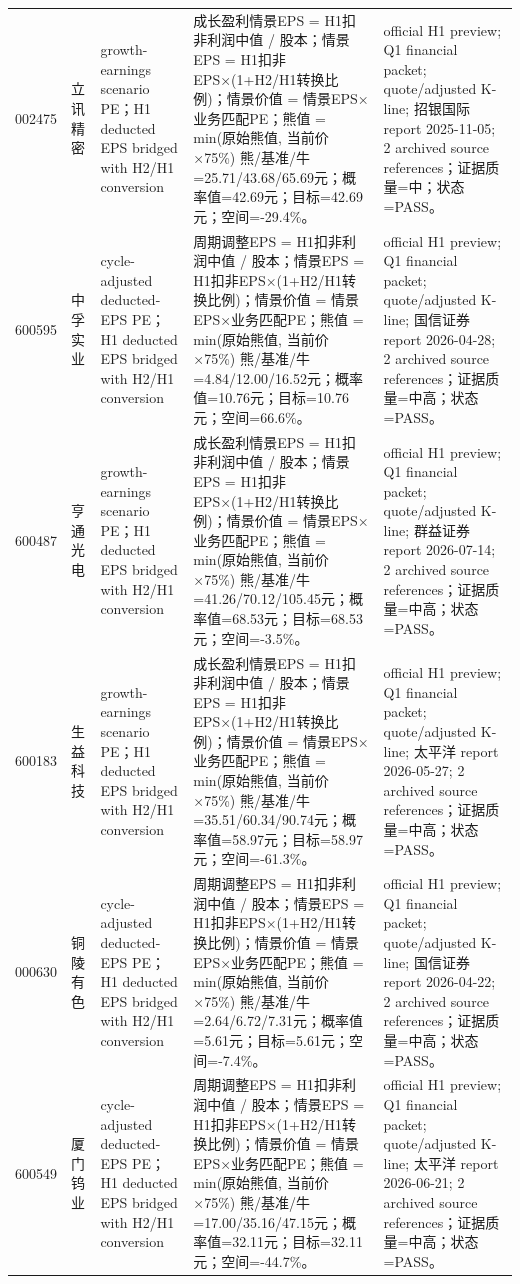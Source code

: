 \begin{longtable}{L{0.85cm}L{1.55cm}L{2.25cm}L{6.0cm}L{4.0cm}}
002475 & 立讯精密 & growth-earnings scenario PE；H1 deducted EPS bridged with H2/H1 conversion & 成长盈利情景EPS = H1扣非利润中值 / 股本；情景EPS = H1扣非EPS×(1+H2/H1转换比例)；情景价值 = 情景EPS×业务匹配PE；熊值 = min(原始熊值, 当前价×75\%) 熊/基准/牛=25.71/43.68/65.69元；概率值=42.69元；目标=42.69元；空间=-29.4\%。 & official H1 preview; Q1 financial packet; quote/adjusted K-line; 招银国际 report 2025-11-05; 2 archived source references；证据质量=中；状态=PASS。 \\
600595 & 中孚实业 & cycle-adjusted deducted-EPS PE；H1 deducted EPS bridged with H2/H1 conversion & 周期调整EPS = H1扣非利润中值 / 股本；情景EPS = H1扣非EPS×(1+H2/H1转换比例)；情景价值 = 情景EPS×业务匹配PE；熊值 = min(原始熊值, 当前价×75\%) 熊/基准/牛=4.84/12.00/16.52元；概率值=10.76元；目标=10.76元；空间=66.6\%。 & official H1 preview; Q1 financial packet; quote/adjusted K-line; 国信证券 report 2026-04-28; 2 archived source references；证据质量=中高；状态=PASS。 \\
600487 & 亨通光电 & growth-earnings scenario PE；H1 deducted EPS bridged with H2/H1 conversion & 成长盈利情景EPS = H1扣非利润中值 / 股本；情景EPS = H1扣非EPS×(1+H2/H1转换比例)；情景价值 = 情景EPS×业务匹配PE；熊值 = min(原始熊值, 当前价×75\%) 熊/基准/牛=41.26/70.12/105.45元；概率值=68.53元；目标=68.53元；空间=-3.5\%。 & official H1 preview; Q1 financial packet; quote/adjusted K-line; 群益证券 report 2026-07-14; 2 archived source references；证据质量=中高；状态=PASS。 \\
600183 & 生益科技 & growth-earnings scenario PE；H1 deducted EPS bridged with H2/H1 conversion & 成长盈利情景EPS = H1扣非利润中值 / 股本；情景EPS = H1扣非EPS×(1+H2/H1转换比例)；情景价值 = 情景EPS×业务匹配PE；熊值 = min(原始熊值, 当前价×75\%) 熊/基准/牛=35.51/60.34/90.74元；概率值=58.97元；目标=58.97元；空间=-61.3\%。 & official H1 preview; Q1 financial packet; quote/adjusted K-line; 太平洋 report 2026-05-27; 2 archived source references；证据质量=中高；状态=PASS。 \\
000630 & 铜陵有色 & cycle-adjusted deducted-EPS PE；H1 deducted EPS bridged with H2/H1 conversion & 周期调整EPS = H1扣非利润中值 / 股本；情景EPS = H1扣非EPS×(1+H2/H1转换比例)；情景价值 = 情景EPS×业务匹配PE；熊值 = min(原始熊值, 当前价×75\%) 熊/基准/牛=2.64/6.72/7.31元；概率值=5.61元；目标=5.61元；空间=-7.4\%。 & official H1 preview; Q1 financial packet; quote/adjusted K-line; 国信证券 report 2026-04-22; 2 archived source references；证据质量=中高；状态=PASS。 \\
600549 & 厦门钨业 & cycle-adjusted deducted-EPS PE；H1 deducted EPS bridged with H2/H1 conversion & 周期调整EPS = H1扣非利润中值 / 股本；情景EPS = H1扣非EPS×(1+H2/H1转换比例)；情景价值 = 情景EPS×业务匹配PE；熊值 = min(原始熊值, 当前价×75\%) 熊/基准/牛=17.00/35.16/47.15元；概率值=32.11元；目标=32.11元；空间=-44.7\%。 & official H1 preview; Q1 financial packet; quote/adjusted K-line; 太平洋 report 2026-06-21; 2 archived source references；证据质量=中高；状态=PASS。 \\

\end{longtable}
